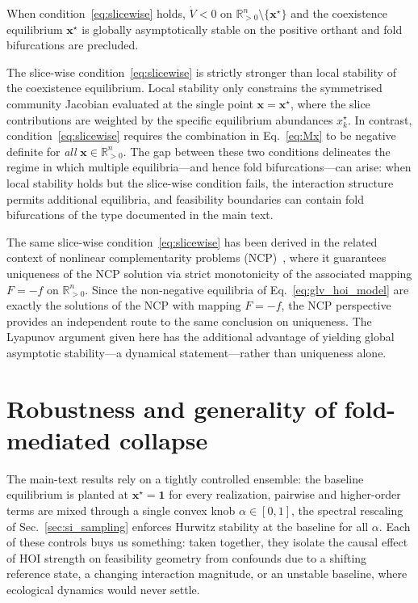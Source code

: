\documentclass[pdflatex,sn-mathphys-num]{sn-jnl}%
\begin{document}
When condition~\eqref{eq:slicewise} holds, $\dot V < 0$ on $\mathbb{R}^n_{>0} \setminus \{\mathbf{x}^\star\}$ and the coexistence equilibrium $\mathbf{x}^\star$ is globally asymptotically stable on the positive orthant and fold bifurcations are precluded.

The slice-wise condition~\eqref{eq:slicewise} is strictly stronger than local stability of the coexistence equilibrium. Local stability only constrains the symmetrised community Jacobian evaluated at the single point $\mathbf{x} = \mathbf{x}^\star$, where the slice contributions are weighted by the specific equilibrium abundances $x_k^\star$. In contrast, condition~\eqref{eq:slicewise} requires the combination in Eq.~\eqref{eq:Mx} to be negative definite for \emph{all} $\mathbf{x} \in \mathbb{R}^n_{>0}$. The gap between these two conditions delineates the regime in which multiple equilibria---and hence fold bifurcations---can arise: when local stability holds but the slice-wise condition fails, the interaction structure permits additional equilibria, and feasibility boundaries can contain fold bifurcations of the type documented in the main text.

The same slice-wise condition~\eqref{eq:slicewise} has been derived in the related context of nonlinear complementarity problems (NCP)~\cite{wang_nonlinear_2010}, where it guarantees uniqueness of the NCP solution via strict monotonicity of the associated mapping $F = -f$ on $\mathbb{R}^n_{>0}$. Since the non-negative equilibria of Eq.~\eqref{eq:glv_hoi_model} are exactly the solutions of the NCP with mapping $F = -f$, the NCP perspective provides an independent route to the same conclusion on uniqueness. The Lyapunov argument given here has the additional advantage of yielding global asymptotic stability---a dynamical statement---rather than uniqueness alone.

\section{Robustness and generality of fold-mediated collapse}
\label{sec:robustness}

The main-text results rely on a tightly controlled ensemble: the baseline equilibrium is planted at $\mathbf{x}^\star = \mathbf{1}$ for every realization, pairwise and higher-order terms are mixed through a single convex knob $\alpha \in [0,1]$, the spectral rescaling of Sec.~\ref{sec:si_sampling} enforces Hurwitz stability at the baseline for all $\alpha$. Each of these controls buys us something: taken together, they isolate the causal effect of HOI strength on feasibility geometry from confounds due to a shifting reference state, a changing interaction magnitude, or an unstable baseline, where ecological dynamics would never settle.
\end{document}
